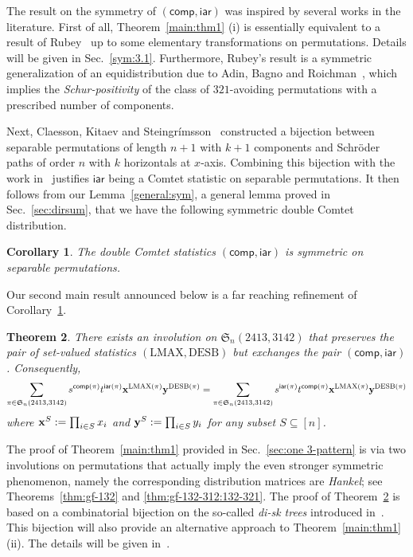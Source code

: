 \documentclass[12pt]{amsart}
\numberwithin{equation}{section}
\theoremstyle{plain}
\newtheorem{theorem}{Theorem}[section]
\newtheorem{corollary}[theorem]{Corollary}
\theoremstyle{definition}
\def\S{\mathfrak{S}}
\def\iar{\mathsf{iar}}
\def\comp{\mathsf{comp}}
\def\LMAX{\mathrm{LMAX}}
\def\DESB{\mathrm{DESB}}
\def\DESB{\mathrm{DESB}}
\begin{document}
The result on the symmetry of $(\comp,\iar)$ was inspired by several works in the literature. First of all, Theorem~\ref{main:thm1} (i) is essentially equivalent to a result of Rubey~\cite{rub} up to some elementary transformations on permutations. Details will be given in Sec.~\ref{sym:3.1}. Furthermore, Rubey's result is a symmetric generalization of an equidistribution due to Adin, Bagno and Roichman~\cite{adin}, which implies the {\em Schur-positivity} of the class of $321$-avoiding permutations with a prescribed number of components. 

Next, Claesson, Kitaev and Steingr\'imsson~\cite[Thm~2.2.48]{kit} constructed a bijection between separable permutations of length $n+1$ with $k+1$ components and Schr\"oder paths of order $n$ with $k$ horizontals at $x$-axis. Combining this bijection with the work in~\cite{FW} justifies $\iar$ being a Comtet statistic on separable permutations. It then follows from our Lemma~\ref{general:sym}, a general lemma proved in Sec.~\ref{sec:dirsum}, that we have the following symmetric double Comtet distribution. 
\begin{corollary}\label{sym:separ}
The double Comtet statistics $(\comp,\iar)$ is symmetric on separable permutations. 
\end{corollary}

Our second main result announced below  is a far reaching refinement of  Corollary~\ref{sym:separ}. 


\begin{theorem}\label{thm:sep:sym}
There exists an involution  on $\S_n(2413,3142)$ that preserves the pair of set-valued statistics $(\LMAX,\DESB)$ but exchanges the pair $(\comp,\iar)$. Consequently,
$$
\sum_{\pi\in\S_n(2413,3142)}s^{\comp(\pi)}t^{\iar(\pi)}{\bf x}^{\LMAX(\pi)}{\bf y}^{\DESB(\pi)}=\sum_{\pi\in\S_n(2413,3142)}s^{\iar(\pi)}t^{\comp(\pi)}{\bf x}^{\LMAX(\pi)}{\bf y}^{\DESB(\pi)}
$$
where ${\bf x}^S:=\prod_{i\in S}x_i$ and ${\bf y}^S:=\prod_{i\in S}y_i$ for any subset $S\subseteq[n]$.  
\end{theorem}

The proof of Theorem~\ref{main:thm1} provided in Sec.~\ref{sec:one 3-pattern} is via two involutions on permutations that actually imply the even stronger symmetric phenomenon, namely the corresponding distribution matrices are {\em Hankel}; see Theorems~\ref{thm:gf-132} and \ref{thm:gf-132-312:132-321}. The proof of Theorem~\ref{thm:sep:sym} is based on a combinatorial bijection on the so-called {\em di-sk trees} introduced in~\cite{flz}. This bijection will also provide an alternative approach to Theorem~\ref{main:thm1}(ii). The details will be given in~\cite{flw2}. 
\end{document}
